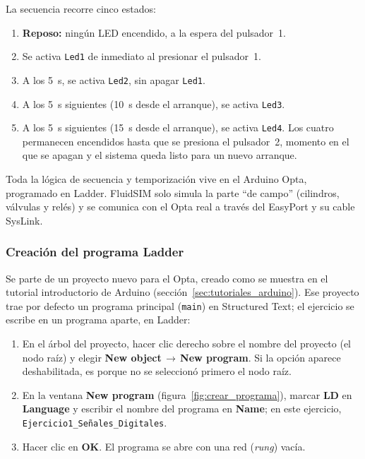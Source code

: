\documentclass[12pt,a4paper]{article}
\newcommand{\ui}[1]{\textcolor{DeepBlue}{\textsf{\textbf{#1}}}}
\newcommand{\menu}[2]{\textcolor{DeepBlue}{\textsf{\textbf{#1}\,$\rightarrow$\,\textbf{#2}}}}
\begin{document}
La secuencia recorre cinco estados:

\begin{enumerate}
    \item \textbf{Reposo:} ningún LED encendido, a la espera del
    pulsador~1.
    \item Se activa \texttt{Led1} de inmediato al presionar el pulsador~1.
    \item A los 5~s, se activa \texttt{Led2}, sin apagar \texttt{Led1}.
    \item A los 5~s siguientes (10~s desde el arranque), se activa
    \texttt{Led3}.
    \item A los 5~s siguientes (15~s desde el arranque), se activa
    \texttt{Led4}. Los cuatro permanecen encendidos hasta que se presiona el
    pulsador~2, momento en el que se apagan y el sistema queda listo para un
    nuevo arranque.
\end{enumerate}

Toda la lógica de secuencia y temporización vive en el Arduino Opta,
programado en Ladder. FluidSIM solo simula la parte ``de campo''
(cilindros, válvulas y relés) y se comunica con el Opta real a través del
EasyPort y su cable SysLink.

\subsubsection{Creación del programa Ladder}
\label{subsubsec:p1_programa}

Se parte de un proyecto nuevo para el Opta, creado como se muestra en el
tutorial introductorio de Arduino (sección~\ref{sec:tutoriales_arduino}).
Ese proyecto trae por defecto un programa principal (\texttt{main}) en
Structured Text; el ejercicio se escribe en un programa aparte, en Ladder:

\begin{enumerate}
    \item En el árbol del proyecto, hacer clic derecho sobre el nombre del
    proyecto (el nodo raíz) y elegir \menu{New object}{New program}. Si la
    opción aparece deshabilitada, es porque no se seleccionó primero el nodo
    raíz.
    \item En la ventana \ui{New program} (figura~\ref{fig:crear_programa}),
    marcar \ui{LD} en \ui{Language} y escribir el nombre del programa en
    \ui{Name}; en este ejercicio, \texttt{Ejercicio1\_\allowbreak Señales\_\allowbreak Digitales}.
    \item Hacer clic en \ui{OK}. El programa se abre con una red
    (\emph{rung}) vacía.
\end{enumerate}
\end{document}
